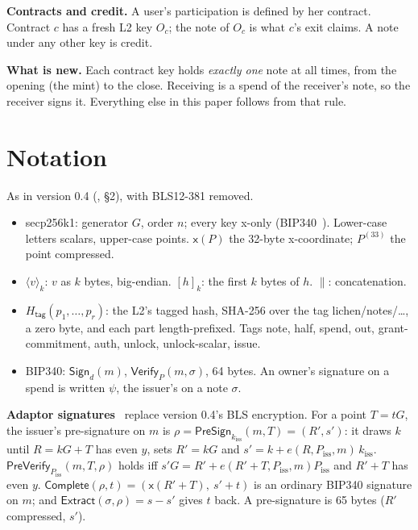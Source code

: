 \documentclass[11pt]{article}
\theoremstyle{plain}
\theoremstyle{definition}
\newcommand{\be}[2]{\langle #1\rangle_{#2}}
\newcommand{\pre}[2]{[#1]_{#2}}
\newcommand{\xo}[1]{\mathsf{x}(#1)}
\newcommand{\Ht}[1]{H_{\textsf{#1}}}
\newcommand{\Sign}{\mathsf{Sign}}
\newcommand{\Vfy}{\mathsf{Verify}}
\newcommand{\PSign}{\mathsf{PreSign}}
\newcommand{\PVfy}{\mathsf{PreVerify}}
\newcommand{\Compl}{\mathsf{Complete}}
\newcommand{\Extr}{\mathsf{Extract}}
\newcommand{\kiss}{k_{\mathrm{iss}}}
\newcommand{\Piss}{P_{\mathrm{iss}}}
\newcommand{\Oc}{O_c}
\begin{document}
\textbf{Contracts and credit.} A user's participation is defined by her
contract. Contract $c$ has a fresh L2 key $\Oc$; the note of $\Oc$ is
what $c$'s exit claims. A note under any other key is credit.

\textbf{What is new.} Each contract key holds \emph{exactly one} note at
all times, from the opening (the mint) to the close. Receiving is a
spend of the receiver's note, so the receiver signs it. Everything else
in this paper follows from that rule.

\section{Notation}\label{sec:notation}

As in version 0.4 (\cite{grants04}, \S2), with BLS12-381 removed.

\begin{itemize}[nosep]
\item secp256k1: generator $G$, order $n$; every key x-only
  (BIP340~\cite{bip340}). Lower-case letters scalars, upper-case points.
  $\xo{P}$ the 32-byte x-coordinate; $P^{(33)}$ the point compressed.
\item $\be{v}{k}$: $v$ as $k$ bytes, big-endian. $\pre{h}{k}$: the first
  $k$ bytes of $h$. $\|$: concatenation.
\item $\Ht{tag}(p_1, \dots, p_r)$: the L2's tagged hash, SHA-256 over the
  tag \textsf{lichen/notes/\ldots}, a zero byte, and each part
  length-prefixed. Tags \textsf{note}, \textsf{half}, \textsf{spend},
  \textsf{out}, \textsf{grant-commitment}, \textsf{auth},
  \textsf{unlock}, \textsf{unlock-scalar}, \textsf{issue}.
\item BIP340: $\Sign_d(m)$, $\Vfy_P(m, \sigma)$, 64 bytes. An owner's
  signature on a spend is written $\psi$, the issuer's on a note
  $\sigma$.
\end{itemize}

\textbf{Adaptor signatures}~\cite{poelstra,aumayr} replace version 0.4's
BLS encryption. For a point $T = tG$, the issuer's pre-signature on $m$
is $\rho = \PSign_{\kiss}(m, T) = (R', s')$: it draws $k$ until $R = kG
+ T$ has even $y$, sets $R' = kG$ and $s' = k + e(R, \Piss, m)\,\kiss$.
$\PVfy_{\Piss}(m, T, \rho)$ holds iff $s'G = R' + e(R' + T, \Piss,
m)\Piss$ and $R' + T$ has even $y$. $\Compl(\rho, t) = (\xo{R' + T},\ s'
+ t)$ is an ordinary BIP340 signature on $m$; and $\Extr(\sigma, \rho) =
s - s'$ gives $t$ back. A pre-signature is 65 bytes ($R'$ compressed,
$s'$).
\end{document}
